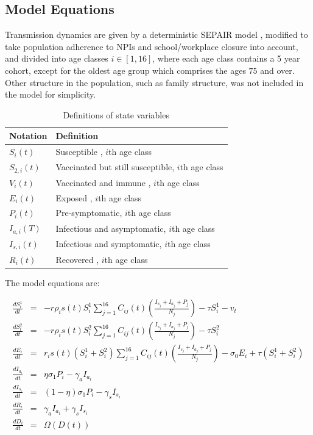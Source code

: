 \subsection{Model Equations}
 
Transmission dynamics are given by a deterministic SEPAIR model \cite{wu2006reducing}, modified to take population adherence to NPIs and school/workplace closure into account, and divided into age classes $i \in [1,16]$, where each age class contains a 5 year cohort, except for the oldest age group which comprises the ages $75$ and over. Other structure in the population, such as family structure, was not included in the model for simplicity. 

\begin{table}
  \centering
   \caption{Definitions of state variables}
   \begin{tabular}{l | l}
      Notation & Definition \\
      \hline
      $S_i(t)$ & Susceptible , $i$th age class\\
      $S_{2,i}(t)$ & Vaccinated but still susceptible, $i$th age class\\
      $V_i(t)$ & Vaccinated and immune , $i$th age class\\
      $E_i(t)$ & Exposed , $i$th age class\\
      $P_i(t)$ & Pre-symptomatic, $i$th age class\\
      $I_{a,i}(T)$ & Infectious and asymptomatic, $i$th age class\\
      $I_{s,i}(t)$ & Infectious and symptomatic, $i$th age class\\
      $R_i(t)$ & Recovered , $i$th age class\\
   \end{tabular} 
\end{table}

The model equations are:

\textcolor{black}{\begin{eqnarray}
  \frac{dS^1_i}{dt} &= & - r \rho_i s(t) S^1_i \sum_{j=1}^{16} C_{ij}(t) \left(\frac{I_{s_j} + I_{a_j} + P_j}{N_j}\right) - \tau S^1_i - v_t \label{S1eqn} \\
  \frac{dS^2_i}{dt} &= & - r \rho_i s(t) S^2_i \sum_{j=1}^{16} C_{ij}(t) \left(\frac{I_{s_j} + I_{a_j}+ P_j}{N_j}\right)  - \tau S^2_i \label{S2eqn} \\
  \frac{dE_i}{dt} &= &  r_i s(t) (S^1_i + S^2_i) \sum_{j=1}^{16} C_{ij}(t) \left(\frac{I_{s_j} + I_{a_j}+ P_j}{N_j}\right) - \sigma_0 E_i + \tau (S^1_i + S^2_i)\label{Eeqn} \\
  \frac{dI_{a_i}}{dt} &= & \eta \sigma_1 P_i - \gamma_a I_{a_i}\label{Iaeqn} \\
  \frac{dI_{s_i}}{dt} &= & (1 - \eta) \sigma_1 P_i - \gamma_s I_{s_i} \label{Iseqn} \\
\frac{dR_i}{dt} &= & \gamma_a I_{a_i} + \gamma_s I_{s_i}  \label{Reqn} \\
\frac{dD_i}{dt} &= & \Omega(D(t)) \label{Deqn}
\end{eqnarray}}

